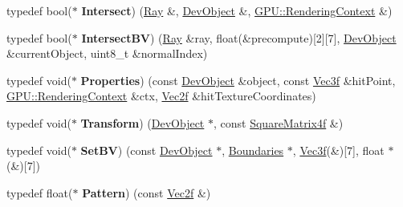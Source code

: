 \begin{DoxyCompactItemize}
\item 
typedef bool($\ast$ {\bfseries Intersect}) (\hyperlink{class_ray}{Ray} \&, \hyperlink{class_dev_object}{Dev\+Object} \&, \hyperlink{struct_g_p_u_1_1_rendering_context}{G\+P\+U\+::\+Rendering\+Context} \&)\hypertarget{group__device__pointers_gadd5691b4d1b8e3d72a8b279063574170}{}\label{group__device__pointers_gadd5691b4d1b8e3d72a8b279063574170}

\item 
typedef bool($\ast$ {\bfseries Intersect\+BV}) (\hyperlink{class_ray}{Ray} \&ray, float(\&precompute)\mbox{[}2\mbox{]}\mbox{[}7\mbox{]}, \hyperlink{class_dev_object}{Dev\+Object} \&current\+Object, uint8\+\_\+t \&normal\+Index)\hypertarget{group__device__pointers_ga651ba9f838240bd32d8ad85a1deec6ce}{}\label{group__device__pointers_ga651ba9f838240bd32d8ad85a1deec6ce}

\item 
typedef void($\ast$ {\bfseries Properties}) (const \hyperlink{class_dev_object}{Dev\+Object} \&object, const \hyperlink{class_vec3}{Vec3f} \&hit\+Point, \hyperlink{struct_g_p_u_1_1_rendering_context}{G\+P\+U\+::\+Rendering\+Context} \&ctx, \hyperlink{class_vec2}{Vec2f} \&hit\+Texture\+Coordinates)\hypertarget{group__device__pointers_ga3db4cb2abc6918447914228ab5019d38}{}\label{group__device__pointers_ga3db4cb2abc6918447914228ab5019d38}

\item 
typedef void($\ast$ {\bfseries Transform}) (\hyperlink{class_dev_object}{Dev\+Object} $\ast$, const \hyperlink{class_square_matrix4}{Square\+Matrix4f} \&)\hypertarget{group__device__pointers_ga7342a43dc846e3462f53f5af48daeab2}{}\label{group__device__pointers_ga7342a43dc846e3462f53f5af48daeab2}

\item 
typedef void($\ast$ {\bfseries Set\+BV}) (const \hyperlink{class_dev_object}{Dev\+Object} $\ast$, \hyperlink{class_boundaries}{Boundaries} $\ast$, \hyperlink{class_vec3}{Vec3f}(\&)\mbox{[}7\mbox{]}, float $\ast$(\&)\mbox{[}7\mbox{]})\hypertarget{group__device__pointers_gaf734749a4b67aed1bb494cb8000f870d}{}\label{group__device__pointers_gaf734749a4b67aed1bb494cb8000f870d}

\item 
typedef float($\ast$ {\bfseries Pattern}) (const \hyperlink{class_vec2}{Vec2f} \&)\hypertarget{group__device__pointers_gacb1d13948594101a67c3ec975d34e9b8}{}\label{group__device__pointers_gacb1d13948594101a67c3ec975d34e9b8}

\end{DoxyCompactItemize}
